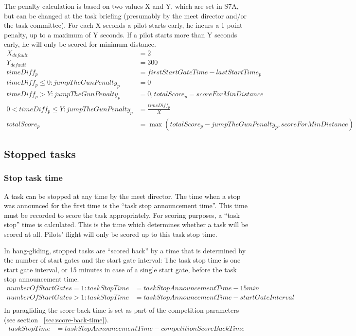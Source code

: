 \documentclass{article}
\begin{document}
The penalty calculation is based on two values X and Y, which are set in S7A,
but can be changed at the task briefing (presumably by the meet director and/or
the task committee). For each X seconds a pilot starts early, he incurs
a 1 point penalty, up to a maximum of Y seconds. If a pilot starts more than
Y seconds early, he will only be scored for minimum distance.
\begin{align*}
    X_{default} &= 2 \\
    Y_{default} &= 300 \\
    timeDiff_p &= firstStartGateTime - lastStartTime_p \\
    timeDiff_p \leq 0 : jumpTheGunPenalty_p &= 0 \\
    timeDiff_p > Y : jumpTheGunPenalty_p &= 0, totalScore_p = scoreForMinDistance \\
    0 < timeDiff_p \leq Y : jumpTheGunPenalty_p &= \frac{timeDiff_p}{X} \\
    totalScore_p &= \max(totalScore_p - jumpTheGunPenalty_p, scoreForMinDistance)
\end{align*}

\subsection{Stopped tasks}
\subsubsection{Stop task time}
\label{sec:stop-task-time}
A task can be stopped at any time by the meet director. The time when a stop
was announced for the first time is the “task stop announcement time”. This
time must be recorded to score the task appropriately. For scoring purposes,
a “task stop” time is calculated. This is the time which determines whether
a task will be scored at all. Pilots’ flight will only be scored up to this
task stop time.

In hang-gliding, stopped tasks are “scored back” by a time that is determined
by the number of start gates and the start gate interval: The task stop time is
one start gate interval, or 15 minutes in case of a single start gate, before
the task stop announcement time.
\begin{align*}
    numberOfStartGates = 1 : taskStopTime &= taskStopAnnouncementTime - 15min \\
    numberOfStartGates > 1 : taskStopTime &= taskStopAnnouncementTime - startGateInterval \\
\end{align*}
In paragliding the score-back time is set as part of the competition parameters
(see section ~\ref{sec:score-back-time}).
\begin{align*}
    taskStopTime &= taskStopAnnouncementTime - competitionScoreBackTime \\
\end{align*}
\end{document}
